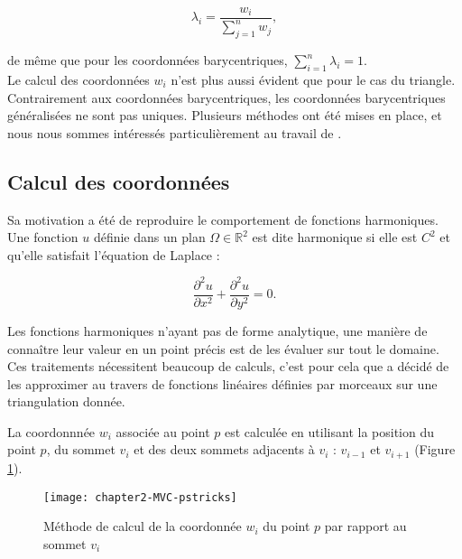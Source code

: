 \begin{equation}
  \lambda_i = \frac{w_i}{\sum_{j=1}^n w_j},
\end{equation}

de même que pour les coordonnées barycentriques, $\sum_{i=1}^n \lambda_i = 1$.
\\

Le calcul des coordonnées $w_i$ n'est plus aussi évident que pour le cas du
triangle. Contrairement aux coordonnées barycentriques, les coordonnées
barycentriques généralisées ne sont pas uniques. Plusieurs méthodes ont été
mises en place, et nous nous sommes intéressés particulièrement au travail de
\cite{Flo03}.

\subsection{Calcul des coordonnées}

Sa motivation a été de reproduire le comportement de fonctions harmoniques.
Une fonction $u$ définie dans un plan $\Omega \in \mathbb{R}^2$ est dite
harmonique si elle est $C^2$ et qu'elle satisfait l'équation de Laplace :

\begin{equation}
  \frac{\partial^2 u}{\partial x^2} + \frac{\partial^2 u}{\partial y^2} = 0.
\end{equation}

Les fonctions harmoniques n'ayant pas de forme analytique, une manière de
connaître leur valeur en un point précis est de les évaluer sur tout le
domaine. Ces traitements nécessitent beaucoup de calculs, c'est pour cela que
\cite{Flo03} a décidé de les approximer au travers de fonctions linéaires
définies par morceaux sur une triangulation donnée.

La coordonnnée $w_i$ associée au point $p$ est calculée en utilisant la
position du point $p$, du sommet $v_i$ et des deux sommets adjacents à $v_i$ :
$v_{i-1}$ et $v_{i+1}$ (Figure \ref{DEFcal}).

\begin{figure}[ht]
  \begin{center}
    \texttt{[image: chapter2-MVC-pstricks]}

    \caption[Méthode de calcul MVC] {Méthode de calcul de la coordonnée $w_i$
du point $p$ par rapport au sommet $v_i$}

    \label{DEFcal}   \end{center} \end{figure}

